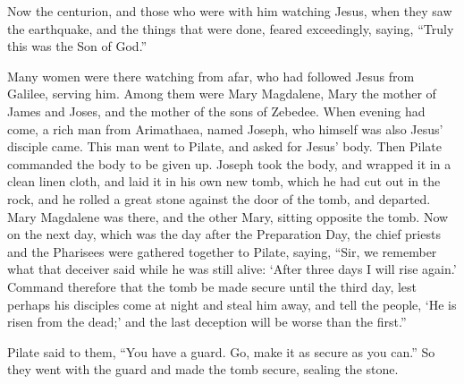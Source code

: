 {Now the centurion, and those who were with him watching Jesus, when they saw the earthquake, and the things that were done, feared exceedingly, saying, “Truly this was the Son of God.”
\par }{\PP {}Many women were there watching from afar, who had followed Jesus from Galilee, serving him.
Among them were Mary Magdalene, Mary the mother of James and Joses, and the mother of the sons of Zebedee.
When evening had come, a rich man from Arimathaea, named Joseph, who himself was also Jesus’ disciple came.
This man went to Pilate, and asked for Jesus’ body. Then Pilate commanded the body to be given up.
Joseph took the body, and wrapped it in a clean linen cloth,
and laid it in his own new tomb, which he had cut out in the rock, and he rolled a great stone against the door of the tomb, and departed.
Mary Magdalene was there, and the other Mary, sitting opposite the tomb.
Now on the next day, which was the day after the Preparation Day, the chief priests and the Pharisees were gathered together to Pilate,
saying, “Sir, we remember what that deceiver said while he was still alive: ‘After three days I will rise again.’
Command therefore that the tomb be made secure until the third day, lest perhaps his disciples come at night and steal him away, and tell the people, ‘He is risen from the dead;’ and the last deception will be worse than the first.”
\par }{\PP {}Pilate said to them, “You have a guard. Go, make it as secure as you can.”
So they went with the guard and made the tomb secure, sealing the stone.

}
